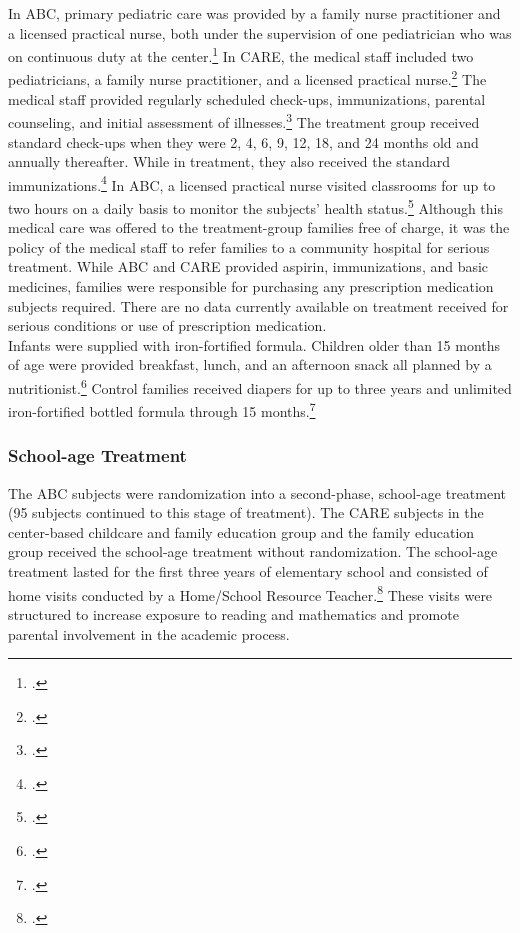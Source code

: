 \noindent In ABC, primary pediatric care was provided by a family nurse practitioner and a licensed practical nurse, both under the supervision of one pediatrician who was on continuous duty at the center.\footnote{\citet{Haskins-et-al_1978_JoPP}.} In CARE, the medical staff included two pediatricians, a family nurse practitioner, and a licensed practical nurse.\footnote{\citet{Bryant_et_al_1987_Carolina_Approach_TIECSE}.} The medical staff provided regularly scheduled check-ups, immunizations, parental counseling, and initial assessment of illnesses.\footnote{\citet{Ramey-et-al_1977_Intro-to-ABC, Bryant_et_al_1987_Carolina_Approach_TIECSE}.} The treatment group received standard check-ups when they were 2, 4, 6, 9, 12, 18, and 24 months old and annually thereafter. While in treatment, they also received the standard immunizations.\footnote{\citet{Bryant_et_al_1987_Carolina_Approach_TIECSE, Campbell_Conti_etal_2014_EarlyChildhoodInvestments}.} In ABC, a licensed practical nurse visited classrooms for up to two hours on a daily basis to monitor the subjects' health status.\footnote{\citet{Sanyal_Henderson_etal_1980_JoPediatrics}.} Although this medical care was offered to the treatment-group families free of charge, it was the policy of the medical staff to refer families to a community hospital for serious treatment. While ABC and CARE provided aspirin, immunizations, and basic medicines, families were responsible for purchasing any prescription medication subjects required. There are no data currently available on treatment received for serious conditions or use of prescription medication.  \\

\noindent Infants were supplied with iron-fortified formula. Children older than 15 months of age were provided breakfast, lunch, and an
afternoon snack all planned by a nutritionist.\footnote{\citet{Bryant_et_al_1987_Carolina_Approach_TIECSE, Campbell_Conti_etal_2014_EarlyChildhoodInvestments,abc2014-2015interviews}.} Control families received diapers for up to three years and unlimited iron-fortified bottled formula through 15 months.\footnote{\citet{Ramey_Collier_etal_1976_CarolinaAbecedarianProject,Ramey_Campbell_1979_SR, Ramey_etal_1985_Project-CARE_TiECSE}.}

\subsubsection{School-age Treatment}

\noindent The ABC subjects were randomization into a second-phase, school-age treatment (95 subjects continued to this stage of treatment). The CARE subjects in the center-based childcare and family education group and the family education group received the school-age treatment without randomization. The school-age treatment lasted for the first three years of elementary school and consisted of home visits conducted by a Home/School Resource Teacher.\footnote{\cite{Burchinal_Campbell_etal_1997_CD}.} These visits were structured to increase exposure to reading and mathematics and promote parental involvement in the academic process.\\

